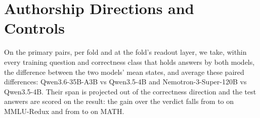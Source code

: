 \begin{table}[h]
\centering
\small

\caption{Every judge--benchmark pair (exploratory protocol). Gap: best layer's direction ranking minus the verdict's, on the split used for the layer rule; 20 splits: mean $\pm$ standard deviation over 20 random half-splits of the questions (at the best layer). Layer: the stretched layer ($^*$: the verdict's sensitivity there is below 0.05). Sens.: the verdict's sensitivity there. Llama-3.1-70B is the scale check of \S\ref{sec:scale}. Last four columns: ranking ($\times$100) of the forced verdict, the verdict after reasoning, the verdict after stretching $\times$11, and the direction, on the main answer pool.}
\label{tab:pairs}
\end{table}

\begin{table}[h]
\centering
\small

\caption{Same-model pairs on questions the judge failed on a sampled attempt, per judge: ranking ($\times$100) by each readout. Groups: questions with at least one right and one wrong answer from the same answering model.}
\label{tab:smpairs}
\end{table}

\section{Authorship Directions and Controls}
\label{app:auth}

On the primary pairs, per fold and at the fold's readout layer, we take, within every training question and correctness class that holds answers by both models, the difference between the two models' mean states, and average these paired differences: Qwen3.6-35B-A3B vs Qwen3.5-4B and Nemotron-3-Super-120B vs Qwen3.5-4B. Their span is projected out of the correctness direction and the test answers are scored on the result: the gain over the verdict falls from  to  on MMLU-Redux and from  to  on MATH.


